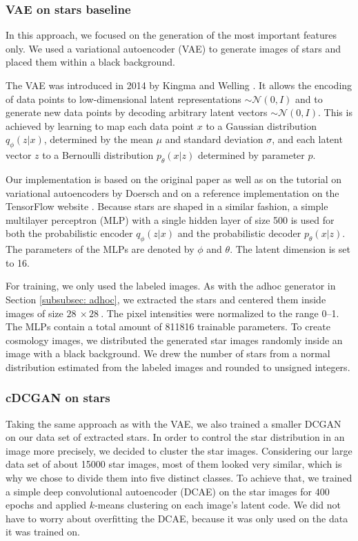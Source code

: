 \documentclass[10pt,conference,compsocconf]{IEEEtran}
\newcommand\TODO[1]{\textcolor{red}{#1}} %
\begin{document}
\subsubsection{VAE on stars baseline} %
In this approach, we focused on the generation of the most important features only. We used a variational autoencoder (VAE) to generate images of stars and placed them within a black background. 


The VAE was introduced in 2014 by Kingma and Welling \cite{DBLP:journals/corr/KingmaW13}. It allows the encoding of data points to low-dimensional latent representations  $\sim\mathcal{N}(0, I)$ and to generate new data points by decoding arbitrary latent vectors $\sim\mathcal{N}(0, I)$. This is achieved by learning to map each data point $x$ to a Gaussian distribution $q_{\phi}(z|x)$, determined by the mean $\mu$ and standard deviation $\sigma$, and each latent vector $z$ to a Bernoulli distribution $p_{\theta}(x|z)$ determined by parameter $p$.
 
Our implementation is based on the original paper as well as on the tutorial on variational autoencoders by Doersch \cite{doersch2016tutorial} and on a reference implementation on the TensorFlow website \cite{cvaetf}. Because stars are shaped in a similar fashion, a simple multilayer perceptron (MLP) with a single hidden layer of size \SI{500}{} is used for both the probabilistic encoder $q_{\phi}(z|x)$ and the probabilistic decoder $p_{\theta}(x|z)$. The parameters of the MLPs are denoted by $\phi$ and $\theta$. The latent dimension is set to \SI{16}{}. 

For training, we only used the labeled images. As with the adhoc generator in Section \ref{subsubsec: adhoc}, we extracted the stars and centered them inside images of size $\SI{28}{}\times\SI{28}{}$. The pixel intensities were normalized to the range \SIrange{0}{1}{}. The MLPs contain a total amount of \SI{811816}{} trainable parameters. To create cosmology images, we distributed the generated star images randomly inside an image with a black background.
We drew the number of stars from a normal distribution estimated from the labeled images and rounded to unsigned integers.

\subsubsection{cDCGAN on stars}
Taking the same approach as with the VAE, we also trained a smaller DCGAN on our data set of extracted stars.
In order to control the star distribution in an image more precisely, we decided to cluster the star images. Considering our large data set of about \SI{15000}{} star images, most of them looked very similar, which is why we chose to divide them into five distinct classes. To achieve that, we trained a simple deep convolutional autoencoder (DCAE) on the star images for 400 epochs and applied $k$-means clustering on each image's latent code. We did not have to worry about overfitting the DCAE, because it was only used on the data it was trained on.
\end{document}
